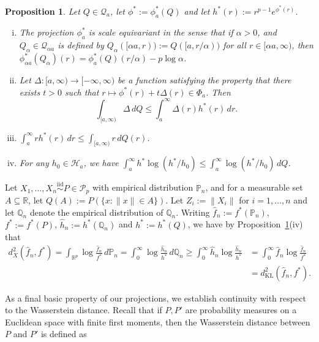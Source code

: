 \documentclass[a4paper,12pt]{article}
\newtheorem{proposition}[theorem]{Proposition}
\newenvironment{remark}[1][Remark:]{\begin{trivlist}
\item[\hskip \labelsep {\bfseries #1}]}{\end{trivlist}}
\begin{document}
\begin{proposition}
  \label{Prop:ProjectionBasicProperties}
Let $Q \in \mathcal{Q}_{a}$, let $\phi^* := \phi_{a}^*(Q)$ and let $h^*(r) := r^{p-1}e^{\phi^*(r)}$.  
  \begin{enumerate}[(i)]
  \item The projection $\phi_{a}^*$ is scale equivariant in the sense that if $\alpha > 0$, and $Q_\alpha \in \mathcal{Q}_{\alpha a}$ is defined by $Q_{\alpha}( [\alpha a, r)) := Q( [a, r/\alpha) )$ for all $r \in [\alpha a, \infty)$, then $\phi^*_{\alpha a}(Q_\alpha)(r) = \phi^*_{a}(Q)(r/\alpha) - p\log \alpha$.
  \item Let $\Delta : [a, \infty) \rightarrow [-\infty, \infty)$ be a function satisfying the property that there exists $t > 0$ such that
    $r \mapsto \phi^*(r) + t \Delta(r) \in \Phi_{a}$. Then
    \[
      \int_{[a,\infty)} \Delta \, dQ \leq \int_{a}^\infty \Delta(r) h^*(r) \, dr.
    \]
  \item $\int_{a}^\infty r h^*(r) \, dr \leq \int_{[a,\infty)} r \, dQ(r)$.
  \item For any $h_0 \in \mathcal{H}_a$, we have $\int_a^\infty h^* \log (h^*/h_0) \leq \int_a^\infty \log (h^*/h_0) \, dQ$.
  \end{enumerate}
\end{proposition}
\begin{remark}
Let $X_1,\ldots,X_n \stackrel{\mathrm{iid}}{\sim} P \in \mathcal{P}_p$ with empirical distribution $\mathbb{P}_n$, and for a measurable set $A \subseteq \mathbb{R}$, let $Q(A) := P(\{x:\|x\| \in A\})$.  Let $Z_i := \|X_i\|$ for $i=1,\ldots,n$ and let $\mathbb{Q}_n$ denote the empirical distribution of $\mathbb{Q}_n$.  Writing $\hat{f}_n := f^*(\mathbb{P}_n)$, $f^* := f^*(P)$, $\hat{h}_n := h^*(\mathbb{Q}_n)$ and $h^* := h^*(Q)$, we have by Proposition~\ref{Prop:ProjectionBasicProperties}(iv) that
\begin{align*}
d_X^2(\hat{f}_n,f^*) = \int_{\mathbb{R}^p} \log \frac{\hat{f}_n}{f^*} \, d\mathbb{P}_n = \int_0^\infty \log \frac{\hat{h}_n}{h^*} \, d\mathbb{Q}_n \geq \int_0^\infty \hat{h}_n \log \frac{\hat{h}_n}{h^*} &= \int_0^\infty \hat{f}_n \log \frac{\hat{f}_n}{f^*} \\
&= d_{\mathrm{KL}}^2(\hat{f}_n,f^*).
\end{align*}
\end{remark}
As a final basic property of our projections, we establish continuity with respect to the Wasserstein distance.  Recall that if $P,P'$ are probability measures on a Euclidean space with finite first moments, then the Wasserstein distance between $P$ and $P'$ is defined as
\end{document}

